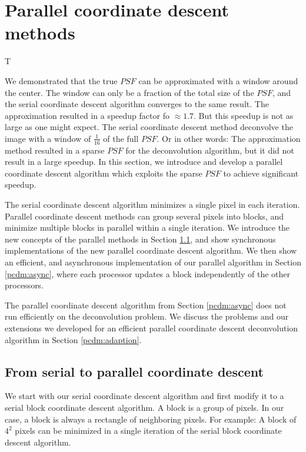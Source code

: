 \section{Parallel coordinate descent methods}\label{pcdm}
T

We demonstrated that the true $PSF$ can be approximated with a window around the center. The window can only be a fraction of the total size of the $PSF$, and the serial coordinate descent algorithm converges to the same result. The approximation resulted in a speedup factor fo $\approx 1.7$. But this speedup is not as large as one might expect. The serial coordinate descent method deconvolve the image with a window of $\frac{1}{16}$ of the full $PSF$. Or in other words: The approximation method resulted in a sparse $PSF$ for the deconvolution algorithm, but it did not result in a large speedup. In this section, we introduce and develop a parallel coordinate descent algorithm which exploits the sparse $PSF$ to achieve significant speedup.

The serial coordinate descent algorithm minimizes a single pixel in each iteration. Parallel coordinate descent methods can group several pixels into blocks, and minimize multiple blocks in parallel within a single iteration. We introduce the new concepts of the parallel methods in Section \ref{pcdm:pcdm}, and show synchronous implementations of the new parallel coordinate descent algorithm. We then show an efficient, and asynchronous implementation of our parallel algorithm in Section \ref{pcdm:async}, where each processor updates a block independently of the other processors.

The parallel coordinate descent algorithm from Section \ref{pcdm:async} does not run efficiently on the deconvolution problem. We discuss the problems and our extensions we developed for an efficient parallel coordinate descent deconvolution algorithm in Section \ref{pcdm:adaption}.


\subsection{From serial to parallel coordinate descent}\label{pcdm:pcdm}
We start with our serial coordinate descent algorithm and first modify it to a serial block coordinate descent algorithm. A block is a group of pixels. In our case, a block is always a rectangle of neighboring pixels. For example: A block of $4^2$ pixels can be minimized in a single iteration of the serial block coordinate descent algorithm.

